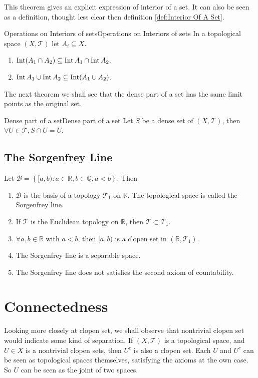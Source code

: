\documentclass[../main.tex]{subfiles}
\begin{document}
This theorem gives an explicit expression of interior of a set. It can also be seen as a definition, thought less clear then definition \ref{def:Interior Of A Set}.

\begin{proposition}{Operations on Interiors of sets}{Operations on Interiors of sets}
In a topological space $(X,\mathcal{T})$ let $A_i \subseteq X$.
\begin{enumerate}
	\item $\operatorname{Int} (A_1\cap A_2) \subseteq  \operatorname{Int} A_1 \cap \operatorname{Int} A_2$.
	\item $\operatorname{Int} A_1 \cup \operatorname{Int} A_2 \subseteq \operatorname{Int} (A_1\cup A_2) $.
\end{enumerate}
\end{proposition}

The next theorem we shall see that the dense part of a set has the same limit points as the original set.
\begin{theorem}{Dense part of a set}{Dense part of a set}
Let $S$ be a dense set of $(X,\mathcal{T})$, then $\forall U \in \mathcal{T}, \overline{S\cap U} = \overline{U}$.
\end{theorem}

\subsection{The Sorgenfrey Line}
Let $\mathcal{B} = \left\{ [a,b) : a\in \mathbb{R},b\in \mathbb{Q},a<b \right\}$. Then
\begin{enumerate}
	\item $\mathcal{B}$ is the basis of a topology $\mathcal{T}_1$ on $\mathbb{R}$. The topological space is called the Sorgenfrey line.
	\item If  $\mathcal{T}$ is the Euclidean topology on $\mathbb{R}$, then $\mathcal{T} \subset \mathcal{T}_1$.
	\item $\forall a,b\in \mathbb{R}$ with $a<b$, then $[a,b)$ is a clopen set in  $(\mathbb{R},\mathcal{T}_1)$.
	\item The Sorgenfrey line is a separable space.
	\item The Sorgenfrey line does not satisfies the second axiom of countability.
\end{enumerate}

\section{Connectedness}
Looking more closely at clopen set, we shall observe that nontrivial clopen set would indicate some kind of separation. If $(X,\mathcal{T})$ is a topological space, and $U \in X$ is a nontrivial clopen sets, then $U^c$ is also a clopen set.  Each $U$ and $U^c$ can be seen as topological spaces themselves, satisfying the axioms at the own case. So $U$ can be seen as the joint of two spaces.
\end{document}
